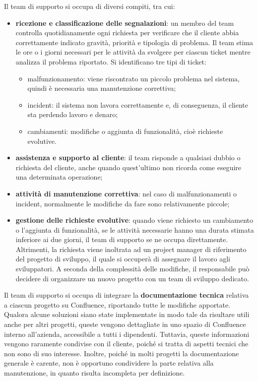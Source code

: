     Il team di supporto si occupa di diversi compiti, tra cui:
    \begin{itemize}
        \item \textbf{ricezione e classificazione delle segnalazioni}: un membro del team controlla quotidianamente ogni richiesta per verificare che il cliente abbia correttamente indicato gravità,
        priorità e tipologia di problema. Il team stima le ore o i giorni necessari per le attività da svolgere per ciascun ticket mentre analizza il problema riportato. Si identificano tre tipi di ticket: 
            \begin{itemize}
                \item malfunzionamento: viene riscontrato un piccolo problema nel sistema, quindi è necessaria una manutenzione correttiva;
                \item incident: il sistema non lavora correttamente e, di conseguenza, il cliente sta perdendo lavoro e denaro;
                \item cambiamenti: modifiche o aggiunta di funzionalità, cioè richieste evolutive.
            \end{itemize}
        \item \textbf{assistenza e supporto al cliente}: il team risponde a qualsiasi dubbio o richiesta del cliente, anche quando quest'ultimo non ricorda come eseguire una determinata operazione;
        \item \textbf{attività di manutenzione correttiva}: nel caso di malfunzionamenti o incident, normalmente le modifiche da fare sono relativamente piccole;
        \item \textbf{gestione delle richieste evolutive}: quando viene richiesto un cambiamento o l'aggiunta di funzionalità, se le attività necessarie hanno
        una durata stimata inferiore ai due giorni, il team di supporto se ne occupa direttamente. Altrimenti, la richiesta viene inoltrata ad un project manager di
        riferimento del progetto di sviluppo, il quale si occuperà di assegnare il lavoro agli sviluppatori. A seconda della complessità delle modifiche, il responsabile
        può decidere di organizzare un nuovo progetto con un team di sviluppo dedicato.        
    \end{itemize}

    Il team di supporto si occupa di integrare la \textbf{documentazione tecnica} relativa a ciascun progetto su Confluence, riportando tutte le modifiche apportate.
    Qualora alcune soluzioni siano state implementate in modo tale da risultare utili anche per altri progetti, queste vengono dettagliate in uno spazio di Confluence
    interno all’azienda, accessibile a tutti i dipendenti. Tuttavia, queste informazioni vengono raramente condivise con il cliente, poiché si tratta di aspetti
    tecnici che non sono di suo interesse. Inoltre, poiché in molti progetti la documentazione generale è carente, non è opportuno condividere la parte relativa alla
    manutenzione, in quanto risulta incompleta per definizione.


